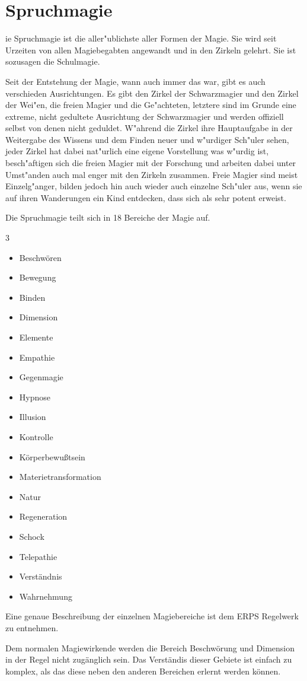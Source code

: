 \section{Spruchmagie} \label{spruchmagie}
ie Spruchmagie
ist die aller"ublichste aller Formen der Magie. Sie wird seit
Urzeiten von allen Magiebegabten angewandt und in den Zirkeln
gelehrt. Sie ist sozusagen die Schulmagie.

\par Seit der Entstehung der Magie, wann auch immer das war, gibt es
auch verschieden Ausrichtungen. Es gibt den Zirkel der Schwarzmagier
und den Zirkel der Wei"en, die freien Magier und die Ge"achteten,
letztere sind im Grunde eine extreme, nicht gedultete Ausrichtung
der Schwarzmagier und werden offiziell selbst von denen nicht
geduldet. W"ahrend die Zirkel ihre Hauptaufgabe in der Weitergabe
des Wissens und dem Finden neuer und w"urdiger Sch"uler sehen, jeder
Zirkel hat dabei nat"urlich eine eigene Vorstellung was w"urdig ist,
besch"aftigen sich die freien Magier mit der Forschung und arbeiten
dabei unter Umst"anden auch mal enger mit den Zirkeln zusammen.
Freie Magier sind meist Einzelg"anger, bilden jedoch hin auch wieder
auch einzelne Sch"uler aus, wenn sie auf ihren Wanderungen ein Kind
entdecken, dass sich als sehr potent erweist.

\par Die Spruchmagie teilt sich in 18 Bereiche der Magie auf.
\begin{multicols}{3}
\begin{itemize}
\item Beschwören
\item Bewegung
\item Binden
\item Dimension
\item Elemente
\item Empathie
\item Gegenmagie
\item Hypnose
\item Illusion
\item Kontrolle
\item Körperbewußtsein
\item Materietransformation
\item Natur
\item Regeneration
\item Schock
\item Telepathie
\item Verständnis
\item Wahrnehmung
\end{itemize}
\end{multicols}
\par Eine genaue Beschreibung der einzelnen Magiebereiche ist dem
ERPS Regelwerk\cite{erps1} zu entnehmen.
\par Dem normalen Magiewirkende werden die Bereich Beschwörung und
Dimension in der Regel nicht zugänglich sein. Das Verständis dieser
Gebiete ist einfach zu komplex, als das diese neben den anderen
Bereichen erlernt werden können.
